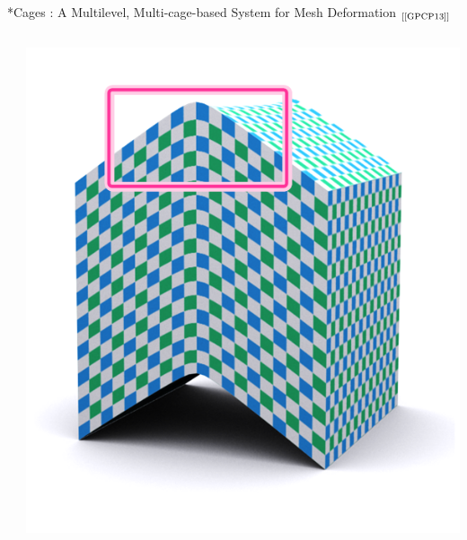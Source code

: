 \documentclass[xcolor=x11names,compress]{beamer}
\renewcommand{\(}{\begin{columns}} \renewcommand{\)}{\end{columns}}
\newcommand{\<}[1]{\begin{column}{#1}} \renewcommand{\>}{\end{column}}
\begin{document}
\begin{frame}{*Cages : A Multilevel, Multi-cage-based System for Mesh Deformation 
  $_{[\text{\cite{GPCP13}}]}$}
\begin{columns}[t]
\begin{column}{0.3\textwidth}
    \end{column}
    \begin{column}{0.3\textwidth}
      \centering
      \includegraphics[scale=0.15]{starCages-Boite-Avec} \\
\end{column}
\end{columns}
\end{frame}
\end{document}
